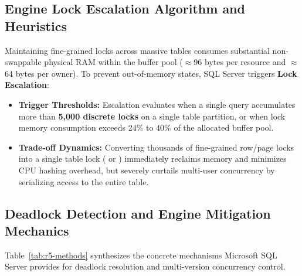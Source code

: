 \subsection{Engine Lock Escalation Algorithm and Heuristics}
Maintaining fine-grained locks across massive tables consumes substantial non-swappable physical RAM within the buffer pool ($\approx$96 bytes per resource and $\approx$64 bytes per owner). To prevent out-of-memory states, SQL Server triggers \textbf{Lock Escalation}:
\begin{itemize}
    \item \textbf{Trigger Thresholds:} Escalation evaluates when a single query accumulates more than \textbf{5,000 discrete locks} on a single table partition, or when lock memory consumption exceeds 24\% to 40\% of the allocated buffer pool.
    \item \textbf{Trade-off Dynamics:} Converting thousands of fine-grained row/page locks into a single table lock ( or ) immediately reclaims memory and minimizes CPU hashing overhead, but severely curtails multi-user concurrency by serializing access to the entire table.
\end{itemize}



\subsection{Deadlock Detection and Engine Mitigation Mechanics}
\label{sec:r5-engine-deadlock-mvcc}

Table~\ref{tab:r5-methods} synthesizes the concrete mechanisms Microsoft SQL Server provides for deadlock resolution and multi-version concurrency control.

